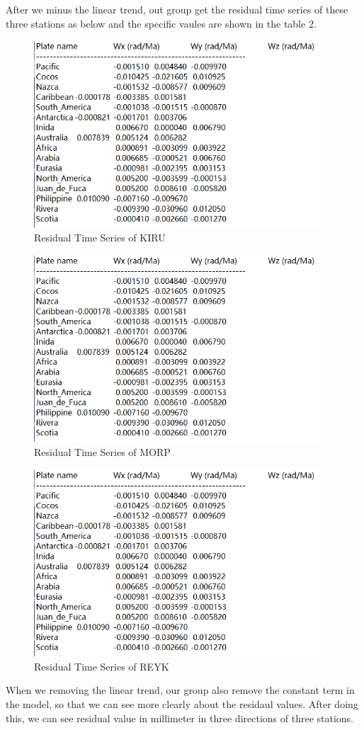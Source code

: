 \documentclass{article}
\begin{document}
After we minus the linear trend, out group get the residual time series of these three stations as below 
and the specific vaules are shown in the table 2.
\vspace{30pt}
\begin{figure}[htbp]
  \centering
  \includegraphics[height=7cm]{../source/nuvel.png}
  \captionsetup{skip=0.2cm}
  \caption{Residual Time Series of KIRU}
  \label{fig:Res_KIRU}
\end{figure}
\begin{figure}[htbp]
  \centering
  \includegraphics[height=7cm]{../source/nuvel.png}
  \caption{Residual Time Series of MORP}
  \label{fig:Res_MORP}
\end{figure}
\begin{figure}[htbp]
  \centering
  \includegraphics[height=7cm]{../source/nuvel.png}
  \caption{Residual Time Series of REYK}
  \label{fig:Res_REYK}
\end{figure}
When we removing the linear trend, our group also remove the constant term in the model, 
so that we can see more clearly about the residaul values.
After doing this, we can see residual value in millimeter in three directions of three stations.
\end{document}
